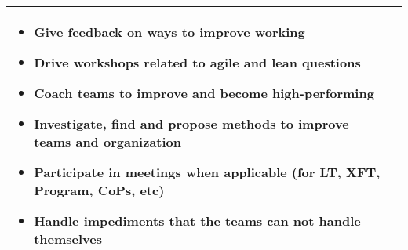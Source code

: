 \begin{table}[h]
\begin{tabularx}{\textwidth}{ | p{6.9cm} | p{6.9cm} | }
   \begin{itemize}[label={}, leftmargin=*, topsep=0pt, itemsep=0pt, partopsep=0pt]
     \item Give feedback on ways to improve working
     \item Drive workshops related to agile and lean questions
     \item Coach teams to improve and become high-performing
     \item Investigate, find and propose methods to improve teams and organization
     \item Participate in meetings when applicable (for LT, XFT, Program, CoPs, etc)
     \item Handle impediments that the teams can not handle themselves 
   \end{itemize} 
   
   \\ \hline

   
   \end{tabularx}
\end{table}

